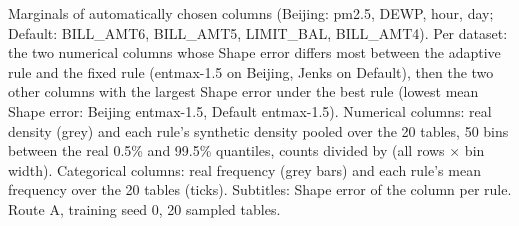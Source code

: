 Marginals of automatically chosen columns (Beijing: pm2.5, DEWP, hour, day; Default: BILL\_AMT6, BILL\_AMT5, LIMIT\_BAL, BILL\_AMT4). Per dataset: the two numerical columns whose Shape error differs most between the adaptive rule and the fixed rule (entmax-1.5 on Beijing, Jenks on Default), then the two other columns with the largest Shape error under the best rule (lowest mean Shape error: Beijing entmax-1.5, Default entmax-1.5). Numerical columns: real density (grey) and each rule's synthetic density pooled over the 20 tables, 50 bins between the real 0.5\% and 99.5\% quantiles, counts divided by (all rows $\times$ bin width). Categorical columns: real frequency (grey bars) and each rule's mean frequency over the 20 tables (ticks). Subtitles: Shape error of the column per rule. Route A, training seed 0, 20 sampled tables.
